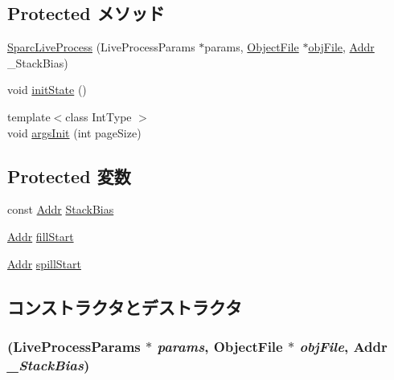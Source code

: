 \subsection*{Protected メソッド}
\begin{DoxyCompactItemize}
\item 
\hyperlink{classSparcLiveProcess_a0078d11945ecc8ac374a64be69d72698}{SparcLiveProcess} (LiveProcessParams $\ast$params, \hyperlink{classObjectFile}{ObjectFile} $\ast$\hyperlink{classLiveProcess_ab6cfcfa7903c66267b3e0351c3caa809}{objFile}, \hyperlink{base_2types_8hh_af1bb03d6a4ee096394a6749f0a169232}{Addr} \_\-StackBias)
\item 
void \hyperlink{classSparcLiveProcess_a3c34ea9b29f410748d4435a667484924}{initState} ()
\item 
{\footnotesize template$<$class IntType $>$ }\\void \hyperlink{classSparcLiveProcess_a2415a441aed245469460cac91152385e}{argsInit} (int pageSize)
\end{DoxyCompactItemize}
\subsection*{Protected 変数}
\begin{DoxyCompactItemize}
\item 
const \hyperlink{base_2types_8hh_af1bb03d6a4ee096394a6749f0a169232}{Addr} \hyperlink{classSparcLiveProcess_a0c923d515c84756a72003bff7ed696b0}{StackBias}
\item 
\hyperlink{base_2types_8hh_af1bb03d6a4ee096394a6749f0a169232}{Addr} \hyperlink{classSparcLiveProcess_a8d30128bf1e2f675a5a3cc5ea79ddb96}{fillStart}
\item 
\hyperlink{base_2types_8hh_af1bb03d6a4ee096394a6749f0a169232}{Addr} \hyperlink{classSparcLiveProcess_a4377422380fb1e1eb5626cb9a631cd65}{spillStart}
\end{DoxyCompactItemize}


\subsection{コンストラクタとデストラクタ}
\hypertarget{classSparcLiveProcess_a0078d11945ecc8ac374a64be69d72698}{
\subsubsection[{SparcLiveProcess}]{ (LiveProcessParams $\ast$ {\em params}, \/  {\bf ObjectFile} $\ast$ {\em objFile}, \/  {\bf Addr} {\em \_\-StackBias})}}
\label{classSparcLiveProcess_a0078d11945ecc8ac374a64be69d72698}



